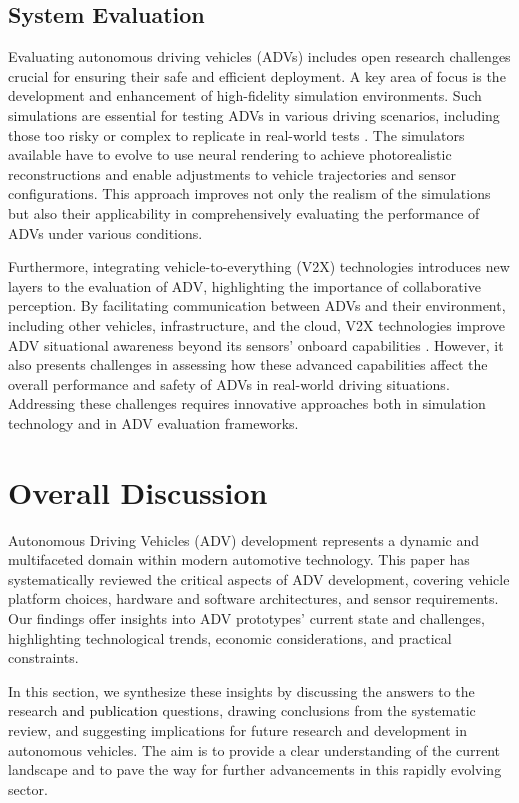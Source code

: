 \documentclass[lettersize,journal]{IEEEtran}
\begin{document}
\color{black}\subsection{System Evaluation}

Evaluating autonomous driving vehicles (ADVs) includes open research challenges crucial for ensuring their safe and efficient deployment. A key area of focus is the development and enhancement of high-fidelity simulation environments. Such simulations are essential for testing ADVs in various driving scenarios, including those too risky or complex to replicate in real-world tests \cite{rosique2019}. The simulators available have to evolve to use neural rendering to achieve photorealistic reconstructions and enable adjustments to vehicle trajectories and sensor configurations. This approach improves not only the realism of the simulations but also their applicability in comprehensively evaluating the performance of ADVs under various conditions.

Furthermore, integrating vehicle-to-everything (V2X) technologies introduces new layers to the evaluation of ADV, highlighting the importance of collaborative perception. By facilitating communication between ADVs and their environment, including other vehicles, infrastructure, and the cloud, V2X technologies improve ADV situational awareness beyond its sensors' onboard capabilities \cite{wu2023,hakak2023}. However, it also presents challenges in assessing how these advanced capabilities affect the overall performance and safety of ADVs in real-world driving situations. Addressing these challenges requires innovative approaches both in simulation technology and in ADV evaluation frameworks.


\color{black}
\section{Overall Discussion}\label{discussion}

Autonomous Driving Vehicles (ADV) development represents a dynamic and multifaceted domain within modern automotive technology. This paper has systematically reviewed the critical aspects of ADV development, covering vehicle platform choices, hardware and software architectures, and sensor requirements. Our findings offer insights into ADV prototypes' current state and challenges, highlighting technological trends, economic considerations, and practical constraints.

In this section, we synthesize these insights by discussing the answers to the research \textcolor{black}{and publication} questions, drawing conclusions from the systematic review, and suggesting implications for future research and development in autonomous vehicles. The aim is to provide a clear understanding of the current landscape and to pave the way for further advancements in this rapidly evolving sector.
\\
\end{document}
